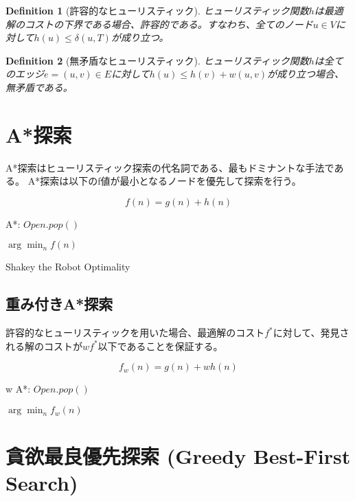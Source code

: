 \documentclass{book}
\newtheorem{definition}{Definition}
\begin{document}
\begin{definition}[許容的なヒューリスティック]
ヒューリスティック関数$h$は最適解のコストの下界である場合、許容的である。すなわち、全てのノード$u \in V$に対して$h(u) \leq \delta(u, T)$が成り立つ。
\end{definition}

\begin{definition}[無矛盾なヒューリスティック]
ヒューリスティック関数$h$は全てのエッジ$e = (u, v) \in E$に対して$h(u) \leq h(v) + w(u,v)$が成り立つ場合、無矛盾である。
\end{definition}


\section{A*探索}
\label{sec:astar-search}

A*探索はヒューリスティック探索の代名詞である、最もドミナントな手法である。
A*探索は以下のf値が最小となるノードを優先して探索を行う。

\begin{equation}
	f(n) = g(n) + h(n)
\end{equation}

\begin{algorithm}
\caption{A*: $Open.pop()$}
\label{alg:astar-open}
	\Return $\arg \min_n f(n)$
\end{algorithm}

Shakey the Robot
Optimality





\subsection{重み付きA*探索}
\label{sec:weighted-astar-search}

許容的なヒューリスティックを用いた場合、最適解のコスト$f^*$に対して、発見される解のコストが$w f^*$以下であることを保証する。

\begin{equation}
	f_w(n) = g(n) + w h(n)
\end{equation}

\begin{algorithm}
\caption{w A*: $Open.pop()$}
\label{alg:wastar-open}
	\Return $\arg \min_n f_w(n)$
\end{algorithm}

\section{貪欲最良優先探索 (Greedy Best-First Search)}
\label{sec:greedy-best-first-search}
\end{document}
